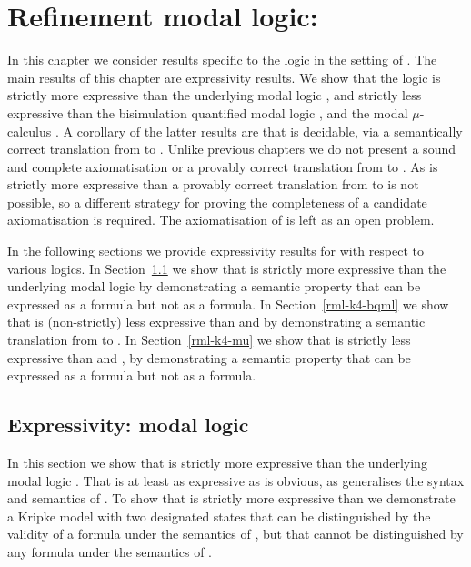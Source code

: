 \chapter{Refinement modal logic: \classKF{}}\label{rml-k4}

In this chapter we consider results specific to the logic \logicRmlKF{} in the setting of \classKF{}.
The main results of this chapter are expressivity results.
We show that the logic \logicRmlKF{} is strictly more expressive than the underlying modal logic \logicKF{}, and strictly less expressive than the bisimulation quantified modal logic \logicBqmlKF{}, and the modal $\mu$-calculus \logicMuKF{}.
A corollary of the latter results are that \logicRmlKF{} is decidable, via a semantically correct translation from \langRml{} to \langBqml{}.
Unlike previous chapters we do not present a sound and complete axiomatisation or a provably correct translation from \langRml{} to \langMl{}.
As \logicRmlKF{} is strictly more expressive than \logicKF{} a provably correct translation from \langRml{} to \langMl{} is not possible, so a different strategy for proving the completeness of a candidate axiomatisation is required.
The axiomatisation of \logicRmlKF{} is left as an open problem.

In the following sections we provide expressivity results for \logicRmlKF{} with respect to various logics.
In Section~\ref{rml-k4-ml} we show that \logicRmlKF{} is strictly more expressive than the underlying modal logic \logicKF{} by demonstrating a semantic property that can be expressed as a \langRml{} formula but not as a \langMl{} formula.
In Section~\ref{rml-k4-bqml} we show that \logicRmlKF{} is (non-strictly) less expressive than \logicBqmlKF{} and \logicMuKF{} by demonstrating a semantic translation from \langRml{} to \langBqml{}.
In Section~\ref{rml-k4-mu} we show that \logicRmlKF{} is strictly less expressive than \logicMuKF{} and \logicBqmlKF{}, by demonstrating a semantic property that can be expressed as a \langMu{} formula but not as a \langRml{} formula.

\section{Expressivity: modal logic}\label{rml-k4-ml}

In this section we show that \logicRmlKF{} is strictly more expressive than the underlying modal logic \logicKF{}.
That \logicRmlKF{} is at least as expressive as \logicKF{} is obvious, as \logicRmlKF{} generalises the syntax and semantics of \logicKF{}.
To show that \logicRmlKF{} is strictly more expressive than \logicKF{} we demonstrate a \classKF{} Kripke model with two designated states that can be distinguished by the validity of a \langRml{} formula under the semantics of \logicRmlKF{}, but that cannot be distinguished by any \langMl{} formula under the semantics of \logicKF{}. 

